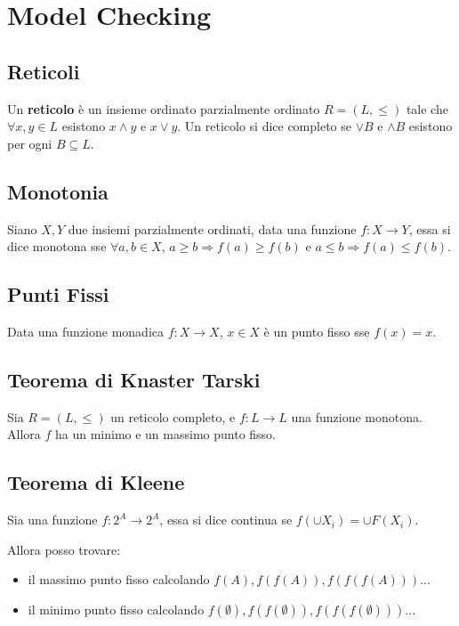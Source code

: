 \chapter{Model Checking}

\section{Reticoli}

Un \textbf{reticolo} \`e un insieme ordinato parzialmente ordinato $R = (L, \leq)$ tale che $\forall x,y \in L$ esistono $x \land y$ e $x \lor y$.
Un reticolo si dice completo se $\lor B$ e $\land B$ esistono per ogni $B \subseteq L$.

\section{Monotonia}

Siano $X, Y$ due insiemi parzialmente ordinati, data una funzione $f : X \rightarrow Y$, essa si dice monotona sse $\forall a, b \in X$, $a \geq b \Rightarrow f(a) \geq f(b)$ e $a \leq b \Rightarrow f(a) \leq f(b)$.

\section{Punti Fissi}

Data una funzione monadica $f : X \rightarrow X$, $x \in X$ \`e un punto fisso sse $f(x) = x$.

\section{Teorema di Knaster Tarski}

Sia $R = (L, \leq)$ un reticolo completo, e $f : L \rightarrow L$ una funzione monotona. Allora $f$ ha un minimo e un massimo punto fisso.

\section{Teorema di Kleene}

Sia una funzione $f : 2^A \rightarrow 2^A$, essa si dice continua se $f(\cup X_i) = \cup F(X_i)$.

Allora posso trovare:

\begin{itemize}
  \item il massimo punto fisso calcolando $f(A), f(f(A)), f(f(f(A))) ...$
  \item il minimo punto fisso calcolando $f(\emptyset), f(f(\emptyset)), f(f(f(\emptyset))) ...$
\end{itemize}

